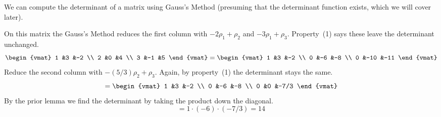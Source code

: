 \documentclass[10pt,t,serif,professionalfont]{beamer}
\begin{document}
\begin{frame}
We can compute the determinant of a matrix using Gauss's Method
(presuming that the determinant function exists, which we will
cover later).

\ex  On this matrix the Gauss's Method reduces the first column  with 
$-2\rho_1+\rho_2$ and $-3\rho_1+\rho_3$.
Property~(1) says these
leave the determinant unchanged.
\begin{equation*}
  \begin{vmat}
    1  &3  &-2 \\
    2  &0  &4  \\
    3  &-1 &5
  \end{vmat}
  =
  \begin{vmat}
    1  &3   &-2 \\
    0  &-6  &-8  \\
    0  &-10 &-11
  \end{vmat}
\end{equation*}
\pause
Reduce the second column with $-(5/3)\rho_2+\rho_3$.
Again, by property~(1) the determinant stays the same.
\begin{equation*}
  =
  \begin{vmat}
    1  &3   &-2 \\
    0  &-6  &-8  \\
    0  &0   &-7/3
  \end{vmat}
\end{equation*}
\pause
By the prior lemma we find the determinant by taking the product down the
diagonal.
\begin{equation*}
  =1\cdot(-6)\cdot(-7/3)=14
\end{equation*}
\end{frame}
\end{document}
